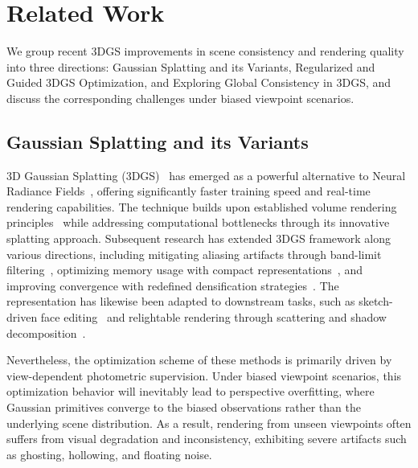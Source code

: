 \documentclass[lettersize,journal]{IEEEtran}
\begin{document}
\section{Related Work}

We group recent 3DGS improvements in scene consistency and rendering quality into three directions: Gaussian Splatting and its Variants, Regularized and Guided 3DGS Optimization, and Exploring Global Consistency in 3DGS, and discuss the corresponding challenges under biased viewpoint scenarios.

\subsection{Gaussian Splatting and its Variants}

3D Gaussian Splatting (3DGS)~\cite{3dgs} has emerged as a powerful alternative to Neural Radiance Fields~\cite{nerf}, offering significantly faster training speed and real-time rendering capabilities. 
The technique builds upon established volume rendering principles~\cite{ewa} while addressing computational bottlenecks through its innovative splatting approach. 
Subsequent research has extended 3DGS framework along various directions, including mitigating aliasing artifacts through band-limit filtering~\cite{mipsplatting}, optimizing memory usage with compact representations~\cite{scaffold,hi-lsplat}, and improving convergence with redefined densification strategies~\cite{ekf-gs,densesplat,steepgs,mcmc}. The representation has likewise been adapted to downstream tasks, such as sketch-driven face editing~\cite{sketchfacegs} and relightable rendering through scattering and shadow decomposition~\cite{ssdgs}.

Nevertheless,
the optimization scheme of these methods is primarily driven by view-dependent photometric supervision. Under biased viewpoint scenarios, this optimization behavior will inevitably lead to perspective overfitting, where Gaussian primitives converge to the biased observations rather than the underlying scene distribution. As a result, rendering from unseen viewpoints often suffers from visual degradation and inconsistency, exhibiting severe artifacts such as ghosting, hollowing, and floating noise.
\end{document}
